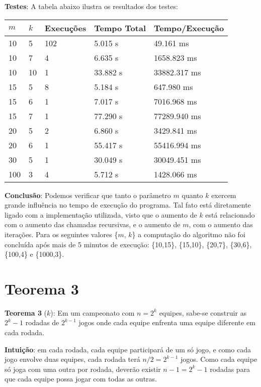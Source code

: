 \textbf{Testes}: A tabela abaixo ilustra os resultados dos testes:

\begin{table}[H]
\centering
\begin{tabular}{l|l|l|l|l}
$m$ & $k$ & Execuções & Tempo Total & Tempo/Execução \\\hline
10 & 5 & 102 & 5.015 s & 49.161 ms \\
10 & 7 & 4 & 6.635 s & 1658.823 ms \\
10 & 10 & 1 & 33.882 s & 33882.317 ms \\
15 & 5 & 8 & 5.184 s & 647.980 ms \\
15 & 6 & 1 & 7.017 s & 7016.968 ms \\
15 & 7 & 1 & 77.290 s & 77289.940 ms \\
20 & 5 & 2 & 6.860 s & 3429.841 ms \\
20 & 6 & 1 & 55.417 s & 55416.994 ms \\
30 & 5 & 1 & 30.049 s & 30049.451 ms \\
100 & 3 & 4 & 5.712 s & 1428.066 ms \\



\end{tabular}
\end{table}

\textbf{Conclusão}: Podemos verificar que tanto o parâmetro $m$ quanto $k$ exercem grande influência no tempo de execução do programa. Tal fato está diretamente ligado com a implementação utilizada, visto que o aumento de $k$ está relacionado com o aumento das chamadas recursivas, e o aumento de $m$, com o aumento das iterações. Para os seguintes valores \{$m$, $k$\} a computação do algoritmo não foi concluída após mais de 5 minutos de execução: \{10,15\}, \{15,10\}, \{20,7\}, \{30,6\}, \{100,4\} e \{1000,3\}.

\section{Teorema 3}

\textbf{Teorema 3} ($k$): Em um campeonato com $n = 2^k$ equipes, sabe-se construir as $2^k - 1$ rodadas de $2^{k - 1}$ jogos onde cada equipe enfrenta uma equipe diferente em cada rodada.

\textbf{Intuição}: em cada rodada, cada equipe participará de um só jogo, e como cada jogo envolve duas equipes, cada rodada terá $n/2 = 2^{k-1}$ jogos. Como cada equipe só joga com uma outra por rodada, deverão existir $n-1 = 2^k -1$ rodadas para que cada equipe possa jogar com todas as outras.

